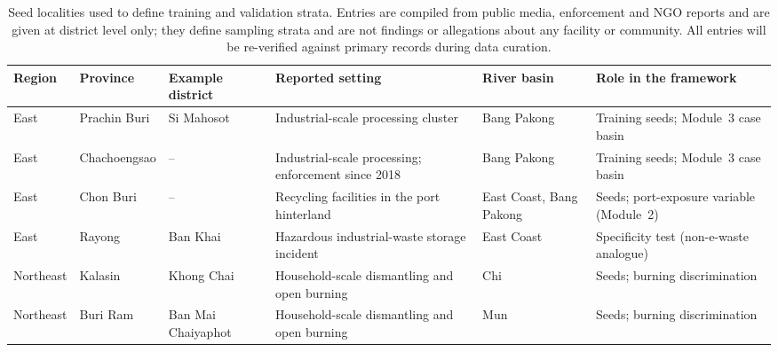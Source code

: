 \begin{table}[t]
\centering
\caption{Seed localities used to define training and validation strata. Entries are compiled from public media, enforcement and NGO reports and are given at district level only; they define sampling strata and are not findings or allegations about any facility or community. All entries will be re-verified against primary records during data curation.}
\label{tab:seeds}
\footnotesize
\begin{tabularx}{\textwidth}{@{}L{1.35cm}L{1.75cm}L{2.15cm}YL{1.75cm}Y@{}}
\toprule
Region & Province & Example district & Reported setting & River basin & Role in the framework\\
\midrule
East & Prachin Buri & Si Mahosot & Industrial-scale processing cluster & Bang Pakong & Training seeds; Module~3 case basin\\
East & Chachoengsao & -- & Industrial-scale processing; enforcement since 2018 & Bang Pakong & Training seeds; Module~3 case basin\\
East & Chon Buri & -- & Recycling facilities in the port hinterland & East Coast, Bang Pakong & Seeds; port-exposure variable (Module~2)\\
East & Rayong & Ban Khai & Hazardous industrial-waste storage incident & East Coast & Specificity test (non-e-waste analogue)\\
Northeast & Kalasin & Khong Chai & Household-scale dismantling and open burning & Chi & Seeds; burning discrimination\\
Northeast & Buri Ram & Ban Mai Chaiyaphot & Household-scale dismantling and open burning & Mun & Seeds; burning discrimination\\
\bottomrule
\end{tabularx}
\end{table}
